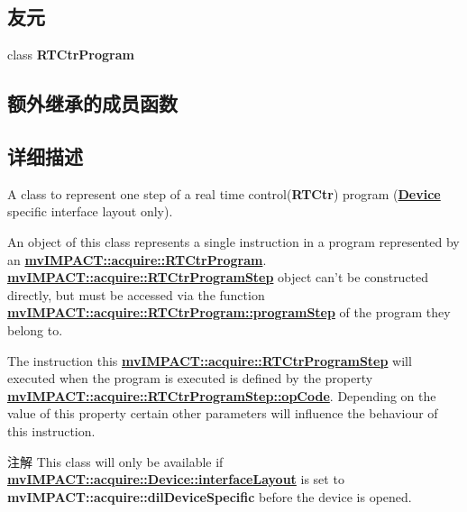 \subsection*{友元}
\begin{DoxyCompactItemize}
\item 
\hypertarget{classmv_i_m_p_a_c_t_1_1acquire_1_1_r_t_ctr_program_step_aba6b541c1e0b106c36bd31585855a154}{class {\bfseries R\+T\+Ctr\+Program}}\label{classmv_i_m_p_a_c_t_1_1acquire_1_1_r_t_ctr_program_step_aba6b541c1e0b106c36bd31585855a154}

\end{DoxyCompactItemize}
\subsection*{额外继承的成员函数}


\subsection{详细描述}
A class to represent one step of a real time control({\bfseries R\+T\+Ctr}) program ({\bfseries \hyperlink{classmv_i_m_p_a_c_t_1_1acquire_1_1_device}{Device}} specific interface layout only). 

An object of this class represents a single instruction in a program represented by an {\bfseries \hyperlink{classmv_i_m_p_a_c_t_1_1acquire_1_1_r_t_ctr_program}{mv\+I\+M\+P\+A\+C\+T\+::acquire\+::\+R\+T\+Ctr\+Program}}. {\bfseries \hyperlink{classmv_i_m_p_a_c_t_1_1acquire_1_1_r_t_ctr_program_step}{mv\+I\+M\+P\+A\+C\+T\+::acquire\+::\+R\+T\+Ctr\+Program\+Step}} object can't be constructed directly, but must be accessed via the function {\bfseries \hyperlink{classmv_i_m_p_a_c_t_1_1acquire_1_1_r_t_ctr_program_ad15489b2d15c594dd44f01d4f515c97f}{mv\+I\+M\+P\+A\+C\+T\+::acquire\+::\+R\+T\+Ctr\+Program\+::program\+Step}} of the program they belong to.

The instruction this {\bfseries \hyperlink{classmv_i_m_p_a_c_t_1_1acquire_1_1_r_t_ctr_program_step}{mv\+I\+M\+P\+A\+C\+T\+::acquire\+::\+R\+T\+Ctr\+Program\+Step}} will executed when the program is executed is defined by the property {\bfseries \hyperlink{classmv_i_m_p_a_c_t_1_1acquire_1_1_r_t_ctr_program_step_a823c9cad26ad628155d68130ad1d6d5d}{mv\+I\+M\+P\+A\+C\+T\+::acquire\+::\+R\+T\+Ctr\+Program\+Step\+::op\+Code}}. Depending on the value of this property certain other parameters will influence the behaviour of this instruction.

\begin{DoxyNote}{注解}
This class will only be available if {\bfseries \hyperlink{classmv_i_m_p_a_c_t_1_1acquire_1_1_device_ab4dd0ecc9d456bb5ddc01d844c9d6f2d}{mv\+I\+M\+P\+A\+C\+T\+::acquire\+::\+Device\+::interface\+Layout}} is set to {\bfseries mv\+I\+M\+P\+A\+C\+T\+::acquire\+::dil\+Device\+Specific} before the device is opened. 
\end{DoxyNote}


